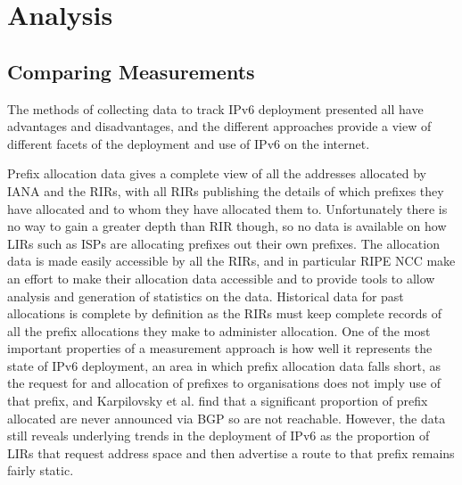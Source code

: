 \section{Analysis}

\subsection{Comparing Measurements}

The methods of collecting data to track IPv6 deployment presented all have
advantages and disadvantages, and the different approaches provide a view of
different facets of the deployment and use of IPv6 on the internet. 

Prefix allocation data gives a complete view of all the addresses allocated by
IANA and the RIRs, with all RIRs publishing the details of which prefixes they
have allocated and to whom they have allocated them to. Unfortunately there is
no way to gain a greater depth than RIR though, so no data is available on how
LIRs such as ISPs are allocating prefixes out their own prefixes. The allocation
data is made easily accessible by all the RIRs, and in particular RIPE NCC make
an effort to make their allocation data accessible and to provide tools to allow
analysis and generation of statistics on the data\cite{ripe_ncc_ripestat_2011}. Historical data for
past allocations is complete by definition as the RIRs must keep complete
records of all the prefix allocations they make to administer allocation. One of
the most important properties of a measurement approach is how well it
represents the state of IPv6 deployment, an area in which prefix allocation data
falls short, as the request for and allocation of prefixes to organisations does
not imply use of that prefix, and Karpilovsky et al. find that a significant
proportion of prefix allocated are never announced via BGP so are not
reachable\cite{karpilovsky_quantifying_2009}.
However, the data still reveals underlying trends in the deployment of IPv6 as
the proportion of LIRs that request address space and then advertise a route to
that prefix remains fairly static.

